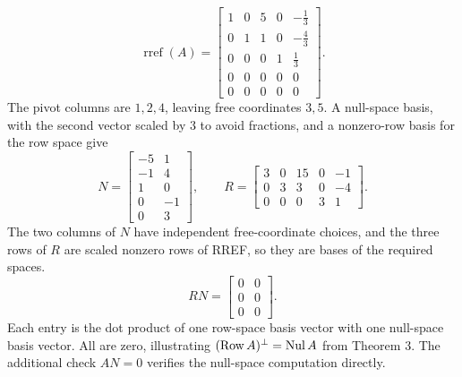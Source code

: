 \[\operatorname{rref}(A)=\left[\begin{array}{rrrrr}1&0&5&0&- \frac{1}{3}\\0&1&1&0&- \frac{4}{3}\\0&0&0&1&\frac{1}{3}\\0&0&0&0&0\\0&0&0&0&0\end{array}\right].\]
The pivot columns are $1,2,4$, leaving free coordinates $3,5$. A null-space basis, with the second vector scaled by $3$ to avoid fractions, and a nonzero-row basis for the row space give
\[N=\left[\begin{array}{rr}-5&1\\-1&4\\1&0\\0&-1\\0&3\end{array}\right],\qquad R=\left[\begin{array}{rrrrr}3&0&15&0&-1\\0&3&3&0&-4\\0&0&0&3&1\end{array}\right].\]
The two columns of $N$ have independent free-coordinate choices, and the three rows of $R$ are scaled nonzero rows of RREF, so they are bases of the required spaces.
\[RN=\left[\begin{array}{rr}0&0\\0&0\\0&0\end{array}\right].\]
Each entry is the dot product of one row-space basis vector with one null-space basis vector. All are zero, illustrating $(\operatorname{Row}A)^\perp=\operatorname{Nul} A$ from Theorem 3. The additional check $AN=0$ verifies the null-space computation directly.
